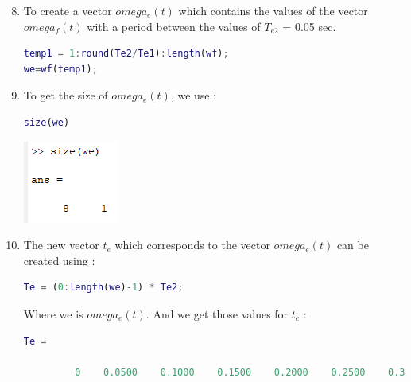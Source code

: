 \documentclass[a4paper,12pt]{article}
\begin{document}
\begin{enumerate}[label={\color{blue}\arabic*)}]
    \setcounter{enumi}{7}

    \item 
    To create a vector \(omega_e(t)\) which contains the values of the vector \(omega_f(t)\) with a period between the values of \(T_{e2}\) = 0.05 sec.
    \begin{lstlisting}[style=Matlab-editor,language=Matlab, basicstyle=\small\ttfamily]
temp1 = 1:round(Te2/Te1):length(wf);
we=wf(temp1);
        \end{lstlisting}
    
    \item 
    To get the size of \(omega_e(t)\), we use :
    \begin{lstlisting}[style=Matlab-editor,language=Matlab, basicstyle=\small\ttfamily]
size(we)
        \end{lstlisting}
    \begin{flushleft}
            \includegraphics[width=0.25\linewidth]{Images/size_we.png}
            \label{Figure5}
        \end{flushleft}

    \item 
    The new vector \(t_e\) which corresponds to the vector \(omega_e(t)\) can be created using :
    \begin{lstlisting}[style=Matlab-editor,language=Matlab, basicstyle=\small\ttfamily]
Te = (0:length(we)-1) * Te2;
        \end{lstlisting}
    Where we is \(omega_e(t)\).
    \newline
    \newline
    And we get those values for \(t_e\) :
    \begin{lstlisting}[style=Matlab-editor,language=Matlab, basicstyle=\small\ttfamily]
Te =

         0    0.0500    0.1000    0.1500    0.2000    0.2500    0.3000    0.3500
        \end{lstlisting}
    

\end{enumerate}
\end{document}
